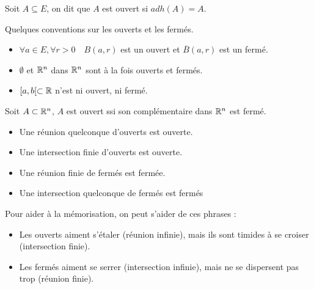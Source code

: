 \begin{definition}
    Soit $A \subseteq E$, on dit que $A$ est ouvert si $adh(A) = A$. 
\end{definition}

\begin{remark}
    Quelques conventions sur les ouverts et les fermés. 
    \begin{itemize}
        \item $ \forall a \in E, \forall r > 0 \quad B(a,r)$ est un ouvert et $\overline{B}(a,r)$ est un fermé. 
        \item $\emptyset$ et $\mathbb{R}^n$ dans $\mathbb{R}^n$ sont à la fois ouverts et fermés. 
        \item $[a,b[ \subset \mathbb{R}$ n'est ni ouvert, ni fermé.  
    \end{itemize}
\end{remark}

\begin{proposition}
    Soit $A \subset \mathbb{R}^n$, $A$ est ouvert ssi son complémentaire dans $\mathbb{R}^n$ est fermé. 
\end{proposition}

\begin{prop}
    \begin{itemize}
        \item Une réunion quelconque d'ouverts est ouverte.
        \item Une intersection finie d'ouverts est ouverte.
        \item Une réunion finie de fermés est fermée.
        \item Une intersection quelconque de fermés est fermés
    \end{itemize}
\end{prop}

\begin{remark}
    Pour aider à la mémorisation, on peut s'aider de ces phrases :
    \begin{itemize}
        \item Les ouverts aiment s’étaler (réunion infinie), mais ils sont timides à se croiser (intersection finie).
        \item Les fermés aiment se serrer (intersection infinie), mais ne se dispersent pas trop (réunion finie).
    \end{itemize}
\end{remark}


